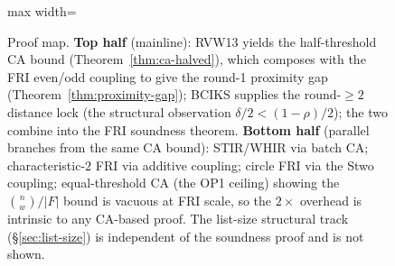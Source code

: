 \documentclass[11pt]{article}
\begin{document}
\begin{figure}[h]
\begin{adjustbox}{max width=\textwidth}
\end{adjustbox}
\caption{Proof map. \textbf{Top half} (mainline): RVW13 yields the half-threshold CA bound (Theorem~\ref{thm:ca-halved}), which composes with the FRI even/odd coupling to give the round-1 proximity gap (Theorem~\ref{thm:proximity-gap}); BCIKS supplies the round-$\geq 2$ distance lock (the structural observation $\delta/2<(1{-}\rho)/2$); the two combine into the FRI soundness theorem. \textbf{Bottom half} (parallel branches from the same CA bound): STIR/WHIR via batch CA; characteristic-$2$ FRI via additive coupling; circle FRI via the Stwo coupling; equal-threshold CA (the OP1 ceiling) showing the $\binom{n}{w}/|F|$ bound is vacuous at FRI scale, so the $2{\times}$ overhead is intrinsic to any CA-based proof. The list-size structural track (\S\ref{sec:list-size}) is independent of the soundness proof and is not shown.}
\label{fig:structure}
\end{figure}
\end{document}
